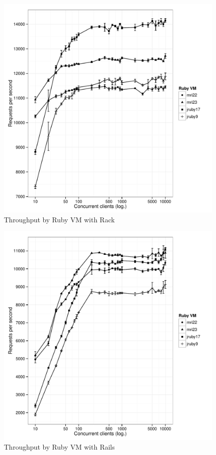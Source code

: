 		\begin{figure}
			\begin{center}
				\includegraphics[width=\textwidth]{images/throughput-vms-rack.pdf}
			\end{center}
			\caption{Throughput by Ruby \ac{VM} with Rack}
			\label{img:evaluation:throughput-vms-rack}
		\end{figure}

		\begin{figure}
			\begin{center}
				\includegraphics[width=\textwidth]{images/throughput-vms-rails.pdf}
			\end{center}
			\caption{Throughput by Ruby \ac{VM} with \ac{Rails}}
			\label{img:evaluation:throughput-vms-rails}
		\end{figure}

